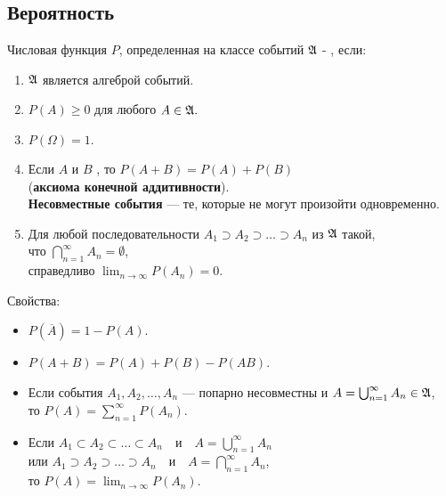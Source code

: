 \subsection{Вероятность}
Числовая функция $P$, определенная на классе событий $\frak{A}$ - , если:
\begin{enumerate}
    \item $\frak{A}$ является алгеброй событий.
    \item $P(A) \geq 0$ для любого $A \in \frak{A}.$
    \item $P(\Omega) = 1.$
    \item Если $A$ и $B$ , то $P(A + B) = P(A) + P(B)$\\
    (\textbf{аксиома конечной аддитивности}).\\
    \textbf{Несовместные события} --- те, которые не могут произойти одновременно.
    \item Для любой последовательности $A_1 \supset A_2 \supset \ldots \supset A_n$ из $\frak{A}$ такой,\\
    что $\bigcap_{n=1}^{\infty} A_n = \emptyset$,\\
    справедливо $\lim_{n \to \infty} P(A_n) = 0$.
\end{enumerate}

Свойства:
\begin{itemize}
    \item $P(\overline{A}) = 1 - P(A)$.
    \item $P(A + B) = P(A) + P(B) - P(AB)$.
    \item Если события $A_1, A_2, \dots, A_n$ --- попарно несовместны
    и $A = \bigcup_{n=1}^{\infty} A_n \in \frak{A}$,\\
    то $P(A) = \sum_{n=1}^\infty P(A_n)$.
    \item Если $A_1 \subset A_2 \subset \ldots \subset A_n \quad \text{и} \quad A=\bigcup_{n=1}^{\infty} A_n$\\
    или $A_1 \supset A_2 \supset \ldots \supset A_n \quad \text{и} \quad A=\bigcap_{n=1}^{\infty} A_n$,\\
    то $P(A) = \lim_{n \to \infty} P(A_n)$.
\end{itemize}
